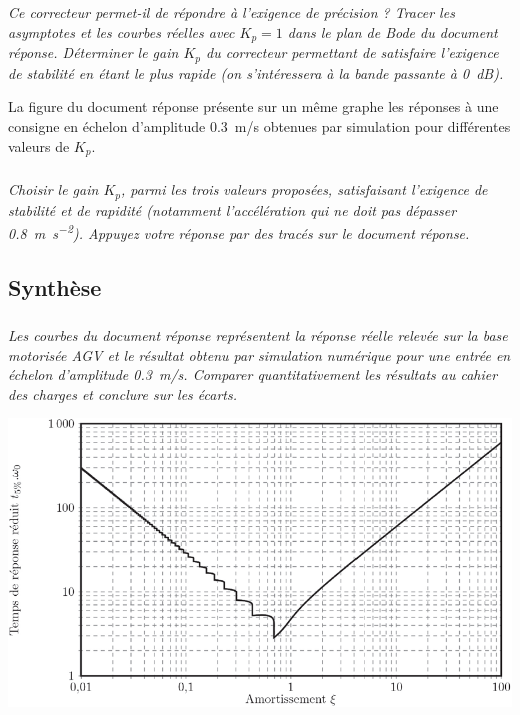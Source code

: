 \begin{multicols}{2}
\begin{multicols}{2}
\subparagraph{}
\textit{Ce correcteur permet-il de répondre à l’exigence de précision ? Tracer les asymptotes et les
courbes réelles avec $K_p = 1$ dans le plan de Bode du document réponse. Déterminer le
gain $K_p$ du correcteur permettant de satisfaire l’exigence de stabilité en étant le plus rapide (on
s’intéressera à la bande passante à \SI{0}{dB}).}
\ifprof
\begin{corrige}
\end{corrige}
\else
\fi

La figure du document réponse présente sur un même graphe les réponses à une consigne en
échelon d’amplitude \SI{0,3}{m/s} obtenues par simulation pour différentes valeurs de $K_p$.


\subparagraph{}
\textit{Choisir le gain $K_p$, parmi les trois valeurs proposées, satisfaisant l’exigence de stabilité et de
rapidité (notamment l’accélération qui ne doit pas dépasser \SI{0,8}{m.s^{-2}}). Appuyez votre réponse
par des tracés sur le document réponse.}
\ifprof
\begin{corrige}
\end{corrige}
\else
\fi


\subsection*{Synthèse}
\subparagraph{}
\textit{Les courbes du document réponse représentent la réponse réelle relevée sur la base
motorisée AGV et le résultat obtenu par simulation numérique pour une entrée en échelon
d’amplitude \SI{0,3}{m/s}. Comparer quantitativement les résultats au cahier des charges et conclure
sur les écarts.}
\ifprof
\begin{corrige}
\end{corrige}
\else
\fi


\begin{center}
\includegraphics[width=\linewidth]{images/ccp_09}
\end{center}



\end{multicols}
\end{multicols}
